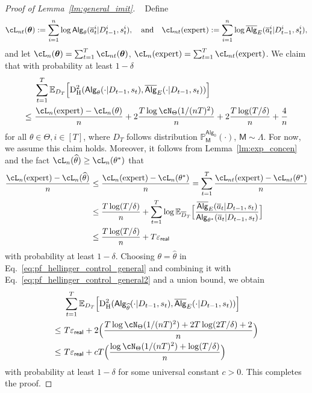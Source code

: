 \documentclass[10pt]{article}
\renewcommand{\epsilon}{\varepsilon}
\newcommand{\<}{\left\langle}
\renewcommand{\>}{\right\rangle}
\newcommand{\E}{\mathbb{E}}
\renewcommand{\P}{\mathbb{P}}
\newcommand{\inst}{{\mathsf{M}}}
\newcommand{\HelDs}{{\mathrm{D}^2_{\mathrm{H}}}}
\newcommand{\widebar}[1]{\overline{#1}}
\newcommand{\state}{{s}}
\newcommand{\eaction}{{\widebar{a}}}
\newcommand{\totlen}{{T}}
\newcommand{\ith}{{i}}
\newcommand{\sAlg}{{\mathsf{Alg}}}
\newcommand{\osAlg}{\overline{\mathsf{Alg}}}
\newcommand{\dset}{{D}}
\newcommand{\adset}{{\widebar{D}}}
\newcommand{\Numobs}{{n}}
\newcommand{\Par}{{\theta}}
\newcommand{\Parspace}{{\Theta}}
\newcommand{\EstPar}{{\widehat{\theta}}}
\newcommand{\TruePar}{{\theta^*}}
\newcommand{\prior}{{\Lambda}}
\newcommand{\expert}{{\mathrm{expert}}}
\newcommand{\shortexp}{{E}}
\newcommand{\geneps}{{\epsilon}_{\sf real}}
\def\btheta{{\boldsymbol \theta}}
\begin{document}
\begin{proof}[Proof of Lemma~\ref{lm:general_imit}]~
Define \begin{align*}\cL_{nt}(\btheta):=\sum_{i=1}^n\log\sAlg_\Par(\eaction^\ith_{t}|\dset_{t-1}^\ith,\state^\ith_t),~~\text{ and }~~\cL_{nt}(\expert):=\sum_{i=1}^n\log\osAlg_{\shortexp}(\eaction^\ith_{t}|\dset_{t-1}^\ith,\state^\ith_t),\end{align*}  and let
$\cL_n(\btheta)=\sum_{t=1}^\totlen \cL_{nt}(\btheta)$, $\cL_n(\expert)=\sum_{t=1}^\totlen \cL_{nt}(\expert)$. We claim that   with probability at least $1-\delta$
\begin{align}
&~ \sum_{t=1}^\totlen\E_{\dset_\totlen}\Big[\HelDs(\sAlg_\Par(\cdot|\dset_{t-1},\state_t),\osAlg_{\shortexp}(\cdot|\dset_{t-1},\state_t))\Big]\notag\\
\leq &~
\frac{\cL_{n}(\expert)-\cL_{n}(\Par)}{n}+2\frac{\totlen\log \cN_{\Parspace}(1/(\Numobs\totlen)^2)}{n}+2\frac{\totlen\log(\totlen/\delta)}{n}+\frac{4}{n}\label{eq:pf_hellinger_control_general}
\end{align}
for all $\Par\in\Parspace,i\in[T]$, where $\dset_\totlen$ follows  distribution $\P_\inst^{\sAlg_0}(\cdot)$, $\inst\sim\prior$. For now, we assume this claim holds. Moreover, it follows from Lemma~\ref{lm:exp_concen} and the fact $\cL_\Numobs(\EstPar)\geq\cL_\Numobs(\TruePar)$ that
\begin{align}
    \frac{\cL_\Numobs(\expert)-\cL_\Numobs(\EstPar)}{\Numobs}
    &\leq
      \frac{\cL_\Numobs(\expert)-\cL_\Numobs(\TruePar)}{\Numobs}=\sum_{t=1}^\totlen
      \frac{\cL_{\Numobs t}(\expert)-\cL_{\Numobs t}(\TruePar)}{\Numobs}\notag\\
      &\leq
      \frac{T\log(T/\delta)}{\Numobs}+\sum_{t=1}^\totlen\log\E_{\adset_\totlen}\Big[{\frac{\osAlg_{\shortexp}(\eaction_t|\dset_{t-1},\state_t)}{\sAlg_\TruePar(\eaction_t|\dset_{t-1},\state_t)}}\Big]\notag\\
&\leq
 \frac{T\log(T/\delta)}{\Numobs}+\totlen\geneps
\label{eq:pf_hellinger_control_general2}
\end{align}
with probability at least $1-\delta$.
Choosing $\Par=\EstPar$ in Eq.~\eqref{eq:pf_hellinger_control_general} and combining it with Eq.~\eqref{eq:pf_hellinger_control_general2} and a union bound, we obtain
\begin{align*}
&~\sum_{t=1}^\totlen\E_{\dset_\totlen}\Big[\HelDs(\sAlg_\EstPar(\cdot|\dset_{t-1},\state_t),\osAlg_{\shortexp}(\cdot|\dset_{t-1},\state_t))\Big]\\
\leq &~
\totlen\geneps
+
2\Big(\frac{\totlen\log \cN_{\Parspace}(1/(\Numobs\totlen)^2)+2\totlen\log(2\totlen/\delta)+2}{n}\Big)\\
\leq&~ \totlen\geneps+c\totlen\Big(\frac{\log \cN_{\Parspace}(1/(\Numobs\totlen)^2)+\log(\totlen/\delta)}{n}\Big)
\end{align*}
with probability at least $1-\delta$ for some universal constant $c>0$.  This completes the proof.

\end{proof}
\end{document}
